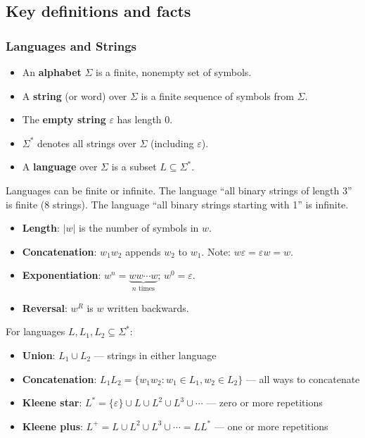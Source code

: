 \subsection*{Key definitions and facts}

\subsubsection*{Languages and Strings}

\begin{definition}
\begin{itemize}
  \item An \textbf{alphabet} $\Sigma$ is a finite, nonempty set of symbols.
  \item A \textbf{string} (or word) over $\Sigma$ is a finite sequence of symbols from $\Sigma$.
  \item The \textbf{empty string} $\varepsilon$ has length 0.
  \item $\Sigma^*$ denotes all strings over $\Sigma$ (including $\varepsilon$).
  \item A \textbf{language} over $\Sigma$ is a subset $L \subseteq \Sigma^*$.
\end{itemize}
\end{definition}

Languages can be finite or infinite. The language ``all binary strings of length 3'' is finite (8 strings). The language ``all binary strings starting with 1'' is infinite.

\begin{definition}
\begin{itemize}
  \item \textbf{Length}: $|w|$ is the number of symbols in $w$.
  \item \textbf{Concatenation}: $w_1 w_2$ appends $w_2$ to $w_1$. Note: $w\varepsilon = \varepsilon w = w$.
  \item \textbf{Exponentiation}: $w^n = \underbrace{ww \cdots w}_{n \text{ times}}$; $w^0 = \varepsilon$.
  \item \textbf{Reversal}: $w^R$ is $w$ written backwards.
\end{itemize}
\end{definition}

\begin{definition}
For languages $L, L_1, L_2 \subseteq \Sigma^*$:
\begin{itemize}
  \item \textbf{Union}: $L_1 \cup L_2$ --- strings in either language
  \item \textbf{Concatenation}: $L_1 L_2 = \{w_1 w_2 : w_1 \in L_1, w_2 \in L_2\}$ --- all ways to concatenate
  \item \textbf{Kleene star}: $L^* = \{\varepsilon\} \cup L \cup L^2 \cup L^3 \cup \cdots$ --- zero or more repetitions
  \item \textbf{Kleene plus}: $L^+ = L \cup L^2 \cup L^3 \cup \cdots = LL^*$ --- one or more repetitions
\end{itemize}
\end{definition}

